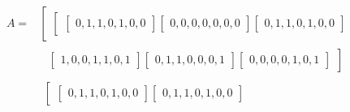 \begin{equation}\label{eq:ej-A}
	\begin{aligned}
	{A} = & \left[\begin{array}{c}\left[\begin{array}{c}
				\left[\begin{array}{c}
					0, 1, 1, 0, 1, 0, 0
				\end{array}\right]
		
				\left[\begin{array}{c}
					0, 0, 0, 0, 0, 0, 0
				\end{array}\right]
		
				\left[\begin{array}{c}
					0, 1, 1, 0, 1, 0, 0
				\end{array}\right]
			\end{array}\right.\end{array}\right. \\
			&
			\left. \begin{array}{c}\left. \begin{array}{c}
				\left[\begin{array}{c}
					1, 0, 0, 1, 1, 0, 1
				\end{array}\right]
				\left[\begin{array}{c}
					0, 1, 1, 0, 0, 0, 1
				\end{array}\right]
				\left[\begin{array}{c}
					0, 0, 0, 0, 1, 0, 1
				\end{array}\right]
			\end{array}\right]\end{array}\right.\\
			&
			\left.\begin{array}{c}\left[\begin{array}{c}
				\left[\begin{array}{c}
					0, 1, 1, 0, 1, 0, 0
				\end{array}\right]
		
				\left[\begin{array}{c}
					0, 1, 1, 0, 1, 0, 0
				\end{array}\right]
		

\end{array}
\end{array}
\end{aligned}
\end{equation}
